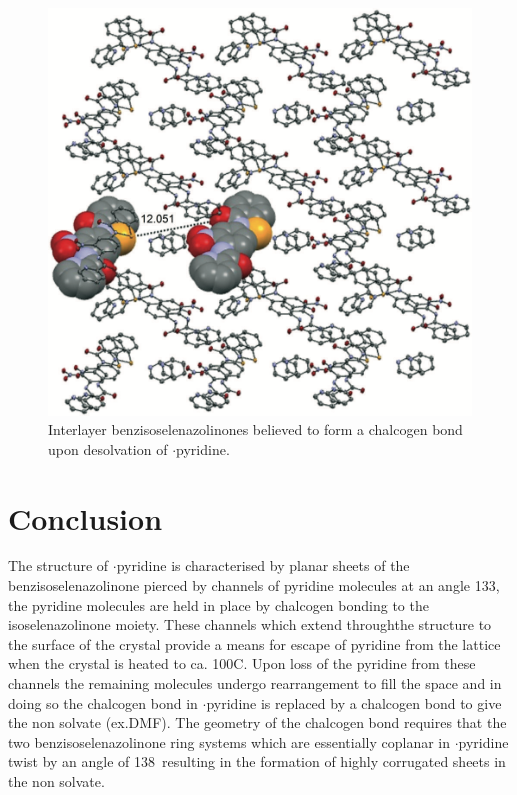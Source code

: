 \begin{figure}
    \centering
    \includegraphics[width=0.8\linewidth]{Figures/ebs-nitroamide-2py-transformation.png}
    \caption{Interlayer benzisoselenazolinones  believed to form a  chalcogen bond upon desolvation of $\cdot$pyridine.}
    \label{fig:ebs-nitroamide-2py-transformation}
\end{figure}

\section{Conclusion}
The structure of $\cdot$pyridine is characterised by planar sheets of the benzisoselenazolinone  pierced by channels of pyridine molecules at an angle 133\degree, the pyridine molecules are held in place by  chalcogen bonding to the isoselenazolinone moiety.
These channels which extend throughthe structure to the surface of the crystal provide a means for escape of pyridine from the lattice when the crystal is heated to ca. 100\degree C.
Upon loss of the pyridine from these channels the remaining molecules undergo rearrangement to fill the space and in doing so the  chalcogen bond in $\cdot$pyridine is replaced by a  chalcogen bond to give the non solvate (ex.DMF). 
The geometry of the chalcogen bond requires that the two benzisoselenazolinone ring systems which are essentially coplanar in $\cdot$pyridine twist by an angle of 138\degree~resulting in the formation of highly corrugated sheets in the non solvate.

